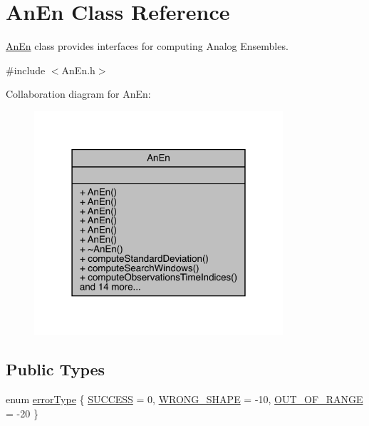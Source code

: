 \hypertarget{class_an_en}{}\section{An\+En Class Reference}
\label{class_an_en}


\mbox{\hyperlink{class_an_en}{An\+En}} class provides interfaces for computing Analog Ensembles.  




{\ttfamily \#include $<$An\+En.\+h$>$}



Collaboration diagram for An\+En\+:\nopagebreak
\begin{figure}[H]
\begin{center}
\leavevmode
\includegraphics[width=262pt]{class_an_en__coll__graph}
\end{center}
\end{figure}
\subsection*{Public Types}
\begin{DoxyCompactItemize}
\item 
enum \mbox{\hyperlink{class_an_en_a0e256eb89d102d318a47d936b02242bf}{error\+Type}} \{ \mbox{\hyperlink{class_an_en_a0e256eb89d102d318a47d936b02242bfa0e5f548f45c8bb94aa25d3f12347194c}{S\+U\+C\+C\+E\+SS}} = 0, 
\mbox{\hyperlink{class_an_en_a0e256eb89d102d318a47d936b02242bfaba4bb62ffbd9a9d41b7c830ca8aa6639}{W\+R\+O\+N\+G\+\_\+\+S\+H\+A\+PE}} = -\/10, 
\mbox{\hyperlink{class_an_en_a0e256eb89d102d318a47d936b02242bfa4692ea596022bae2dfed00f33ea91e65}{O\+U\+T\+\_\+\+O\+F\+\_\+\+R\+A\+N\+GE}} = -\/20
 \}
\end{DoxyCompactItemize}
